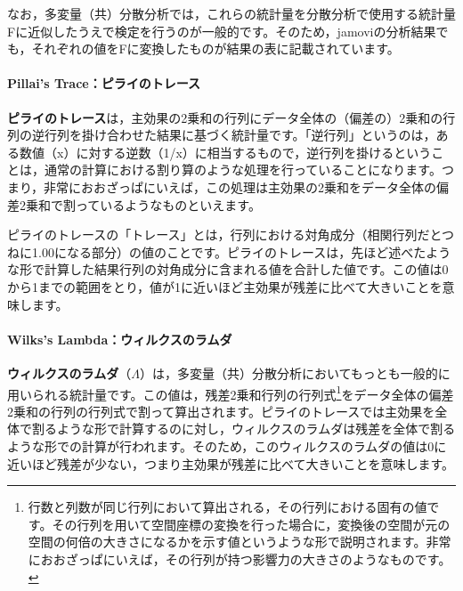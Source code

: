 \documentclass[
  12pt,
  a5jpaper,
  lualatex, ja=standard]{bxjsbook}
\renewcommand{\emph}[1]{\textbf{\color{emph} #1}}
\begin{document}
なお，多変量（共）分散分析では，これらの統計量を分散分析で使用する統計量Fに近似したうえで検定を行うのが一般的です。そのため，jamoviの分析結果でも，それぞれの値をFに変換したものが結果の表に記載されています。

\hypertarget{pillais-traceux30d4ux30e9ux30a4ux306eux30c8ux30ecux30fcux30b9}{%
\paragraph*{Pillai's Trace：ピライのトレース}\label{pillais-traceux30d4ux30e9ux30a4ux306eux30c8ux30ecux30fcux30b9}}

\emph{ピライのトレース}は，主効果の2乗和の行列にデータ全体の（偏差の）2乗和の行列の逆行列を掛け合わせた結果に基づく統計量です。「逆行列」というのは，ある数値（x）に対する逆数（1/x）に相当するもので，逆行列を掛けるということは，通常の計算における割り算のような処理を行っていることになります。つまり，非常におおざっぱにいえば，この処理は主効果の2乗和をデータ全体の偏差2乗和で割っているようなものといえます。

ピライのトレースの「トレース」とは，行列における対角成分（相関行列だとつねに1.00になる部分）の値のことです。ピライのトレースは，先ほど述べたような形で計算した結果行列の対角成分に含まれる値を合計した値です。この値は0から1までの範囲をとり，値が1に近いほど主効果が残差に比べて大きいことを意味します。

\hypertarget{wilkss-lambdaux30a6ux30a3ux30ebux30afux30b9ux306eux30e9ux30e0ux30c0}{%
\paragraph*{Wilks's Lambda：ウィルクスのラムダ}\label{wilkss-lambdaux30a6ux30a3ux30ebux30afux30b9ux306eux30e9ux30e0ux30c0}}

\emph{ウィルクスのラムダ}（\(\Lambda\)）は，多変量（共）分散分析においてもっとも一般的に用いられる統計量です。この値は，残差2乗和行列の行列式\footnote{行数と列数が同じ行列において算出される，その行列における固有の値です。その行列を用いて空間座標の変換を行った場合に，変換後の空間が元の空間の何倍の大きさになるかを示す値というような形で説明されます。非常におおざっぱにいえば，その行列が持つ影響力の大きさのようなものです。}をデータ全体の偏差2乗和の行列の行列式で割って算出されます。ピライのトレースでは主効果を全体で割るような形で計算するのに対し，ウィルクスのラムダは残差を全体で割るような形での計算が行われます。そのため，このウィルクスのラムダの値は0に近いほど残差が少ない，つまり主効果が残差に比べて大きいことを意味します。
\end{document}
